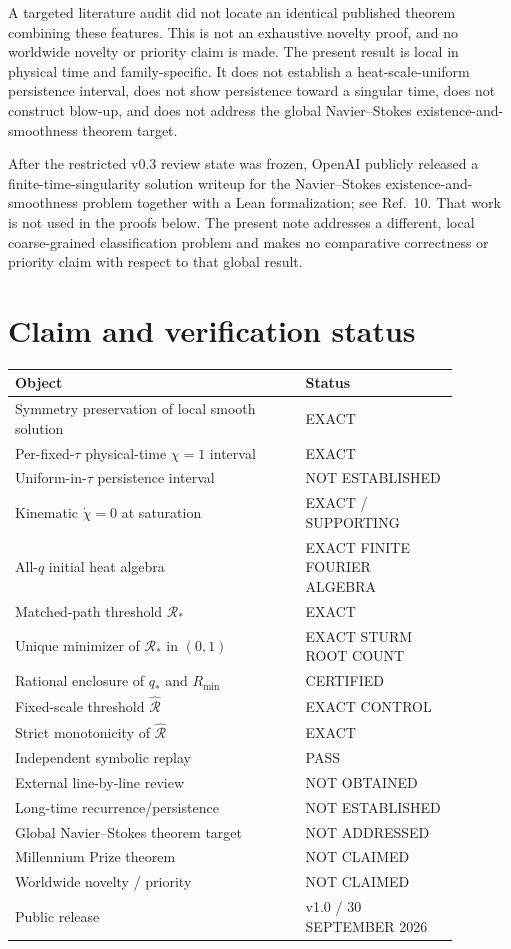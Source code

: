 \documentclass[11pt,a4paper]{article}
\begin{document}
A targeted literature audit did not locate an identical published theorem combining these features. This is not an exhaustive novelty proof, and no worldwide novelty or priority claim is made. The present result is local in physical time and family-specific. It does not establish a heat-scale-uniform persistence interval, does not show persistence toward a singular time, does not construct blow-up, and does not address the global Navier--Stokes existence-and-smoothness theorem target.

After the restricted v0.3 review state was frozen, OpenAI publicly released a finite-time-singularity solution writeup for the Navier--Stokes existence-and-smoothness problem together with a Lean formalization; see Ref.~10. That work is not used in the proofs below. The present note addresses a different, local coarse-grained classification problem and makes no comparative correctness or priority claim with respect to that global result.

\section{Claim and verification status}
\begin{center}
\begin{tabular}{>{\raggedright\arraybackslash}p{0.58\linewidth}p{0.30\linewidth}}
\toprule
Object & Status\\
\midrule
Symmetry preservation of local smooth solution & EXACT\\
Per-fixed-$\tau$ physical-time $\chi=1$ interval & EXACT\\
Uniform-in-$\tau$ persistence interval & NOT ESTABLISHED\\
Kinematic $\dot\chi=0$ at saturation & EXACT / SUPPORTING\\
All-$q$ initial heat algebra & EXACT FINITE FOURIER ALGEBRA\\
Matched-path threshold $\mathcal R_*$ & EXACT\\
Unique minimizer of $\mathcal R_*$ in $(0,1)$ & EXACT STURM ROOT COUNT\\
Rational enclosure of $q_*$ and $R_{\min}$ & CERTIFIED\\
Fixed-scale threshold $\widehat{\mathcal R}$ & EXACT CONTROL\\
Strict monotonicity of $\widehat{\mathcal R}$ & EXACT\\
Independent symbolic replay & PASS\\
External line-by-line review & NOT OBTAINED\\
Long-time recurrence/persistence & NOT ESTABLISHED\\
Global Navier--Stokes theorem target & NOT ADDRESSED\\
Millennium Prize theorem & NOT CLAIMED\\
Worldwide novelty / priority & NOT CLAIMED\\
Public release & v1.0 / 30 SEPTEMBER 2026\\
\bottomrule
\end{tabular}
\end{center}
\end{document}
